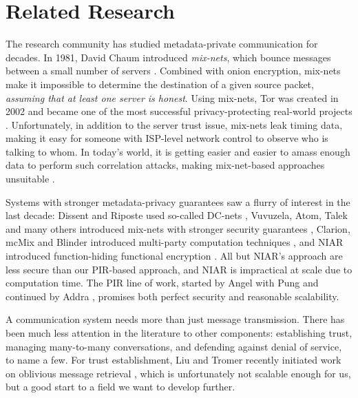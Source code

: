\section{Related Research}

The research community has studied metadata-private communication for decades. In 1981, David Chaum introduced \textit{mix-nets}, which bounce messages between a small number of servers \cite{chaum1981untraceable}. Combined with onion encryption, mix-nets make it impossible to determine the destination of a given source packet, \textit{assuming that at least one server is honest}. Using mix-nets, Tor was created in 2002 and became one of the most successful privacy-protecting real-world projects \cite{dingledine2004tor}. Unfortunately, in addition to the server trust issue, mix-nets leak timing data, making it easy for someone with ISP-level network control to observe who is talking to whom. In today's world, it is getting easier and easier to amass enough data to perform such correlation attacks, making mix-net-based approaches unsuitable \cite{karunanayake2021anonymisation}.

Systems with stronger metadata-privacy guarantees saw a flurry of interest in the last decade: Dissent and Riposte  used so-called DC-nets \cite{corrigan2010dissent,corrigan2015riposte}, Vuvuzela, Atom, Talek and many others  introduced mix-nets with stronger security guarantees \cite{van2015vuvuzela,cheng2020talek,kwon2017atom}, Clarion, mcMix and Blinder introduced multi-party computation techniques \cite{alexopoulos2017mcmix,eskandarian2021clarion,abraham2020blinder}, and NIAR  introduced function-hiding functional encryption \cite{shi2021non,bunz2021non}.
All but NIAR's approach are less secure than our PIR-based approach, and NIAR is impractical at scale due to computation time.
The PIR line of work, started by Angel with Pung \cite{angel2016unobservable,angel2018pir} and continued by Addra \cite{ahmad2021addra}, promises both perfect security and reasonable scalability.

A communication system needs more than just message transmission. There has been much less attention in the literature to other components: establishing trust, managing many-to-many conversations, and defending against denial of service, to name a few. For trust establishment, Liu and Tromer recently initiated work on oblivious message retrieval \cite{liutromer2021}, which is unfortunately not scalable enough for us, but a good start to a field we want to develop further.